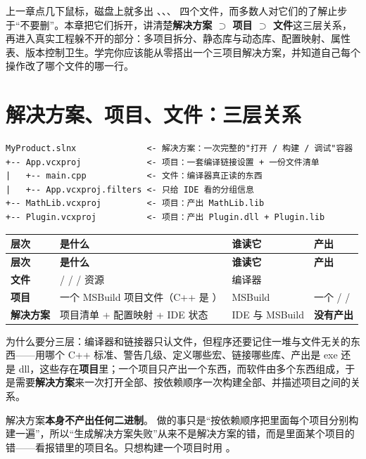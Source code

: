 
上一章点几下鼠标，磁盘上就多出 、、、 四个文件，而多数人对它们的了解止步于“不要删”。本章把它们拆开，讲清楚\textbf{解决方案 $\supset$ 项目 $\supset$ 文件}这三层关系，再进入真实工程躲不开的部分：多项目拆分、静态库与动态库、配置映射、属性表、版本控制卫生。学完你应该能从零搭出一个三项目解决方案，并知道自己每个操作改了哪个文件的哪一行。

\section{解决方案、项目、文件：三层关系}

\begin{lstlisting}[style=textstyle, breaklines=true]
MyProduct.slnx              <- 解决方案：一次完整的"打开 / 构建 / 调试"容器
+-- App.vcxproj             <- 项目：一套编译链接设置 + 一份文件清单
|   +-- main.cpp            <- 文件：编译器真正读的东西
|   +-- App.vcxproj.filters <- 只给 IDE 看的分组信息
+-- MathLib.vcxproj         <- 项目：产出 MathLib.lib
+-- Plugin.vcxproj          <- 项目：产出 Plugin.dll + Plugin.lib
\end{lstlisting}

\begin{longtable}{L{2.2cm}L{5.6cm}L{3.4cm}L{2.6cm}}
\toprule
\textbf{层次} & \textbf{是什么} & \textbf{谁读它} & \textbf{产出} \\
\midrule
\endfirsthead
\toprule
\textbf{层次} & \textbf{是什么} & \textbf{谁读它} & \textbf{产出} \\
\midrule
\endhead
\bottomrule
\endlastfoot
\textbf{文件} &  /  /  / 资源 & 编译器  &  \\
\textbf{项目} & 一个 MSBuild 项目文件（C++ 是 ） & MSBuild & 一个  /  /  \\
\textbf{解决方案} & 项目清单 + 配置映射 + IDE 状态 & IDE 与 MSBuild & \textbf{没有产出} \\
\end{longtable}

为什么要分三层：编译器和链接器只认文件，但程序还要记住一堆与文件无关的东西——用哪个 C++ 标准、警告几级、定义哪些宏、链接哪些库、产出是 exe 还是 dll，这些存在\textbf{项目}里；一个项目只产出一个东西，而软件由多个东西组成，于是需要\textbf{解决方案}来一次打开全部、按依赖顺序一次构建全部、并描述项目之间的关系。

\begin{warnbox}[注意]
解决方案\textbf{本身不产出任何二进制}。 做的事只是“按依赖顺序把里面每个项目分别构建一遍”，所以“生成解决方案失败”从来不是解决方案的错，而是里面某个项目的错——看报错里的项目名。只想构建一个项目时用 。
\end{warnbox}

